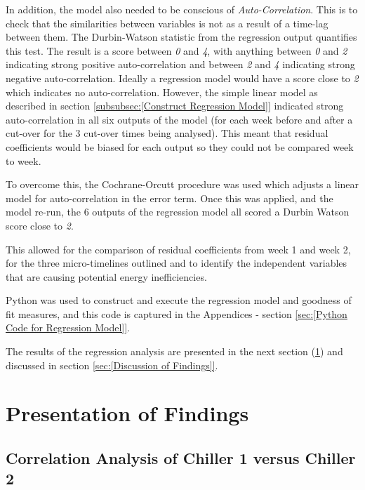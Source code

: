 \documentclass[12pt]{scrartcl}
\begin{document}
In addition, the model also needed to be conscious of \textit{Auto-Correlation}. This is to check that the similarities between variables is not as a result of a time-lag between them. The Durbin-Watson statistic from the regression output quantifies this test. The result is a score between \textit{0} and \textit{4}, with anything between \textit{0} and \textit{2} indicating strong positive auto-correlation and between \textit{2} and \textit{4} indicating strong negative auto-correlation. Ideally a regression model would have a score close to \textit{2} which indicates no auto-correlation. However, the simple linear model as described in section \ref{subsubsec:[Construct Regression Model]} indicated strong auto-correlation in all six outputs of the model (for each week before and after a cut-over  for the 3 cut-over times being analysed). This meant that residual coefficients would be biased for each output so they could not be compared week to week.      

To overcome this, the Cochrane-Orcutt procedure was used which adjusts a linear model for auto-correlation in the error term. Once this was applied, and the model re-run, the 6 outputs of the regression model all scored a Durbin Watson score close to \textit{2}. 

This allowed for the comparison of residual coefficients from week 1 and week 2, for the three micro-timelines outlined and to identify the independent variables that are causing potential energy inefficiencies. 

Python was used to construct and execute the regression model and goodness of fit measures, and this code is captured in the Appendices - section \ref{sec:[Python Code for Regression Model]}. 

The results of the regression analysis are presented in the next section (\ref{sec:[Presentation of Findings]}) and discussed in section \ref{sec:[Discussion of Findings]}.   


\section{Presentation of Findings}
\label{sec:[Presentation of Findings]}

\subsection{Correlation Analysis of Chiller 1 versus Chiller 2}
\label{subsec:[Correlation Analysis of Chiller 1 versus Chiller 2]}
\end{document}
